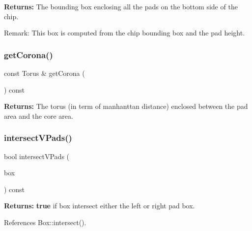 {\bfseries Returns\+:} The bounding box enclosing all the pads on the bottom side of the chip.

\begin{DoxyParagraph}{Remark\+: This box is computed from the chip bounding box and the pad height. }

\end{DoxyParagraph}
\mbox{\label{classKatabatic_1_1ChipTools_a19c65013cccd38e5d4169fc25454b938}} 
\subsubsection{\texorpdfstring{get\+Corona()}{getCorona()}}
{\footnotesize\ttfamily const Torus \& get\+Corona (\begin{DoxyParamCaption}{ }\end{DoxyParamCaption}) const\hspace{0.3cm}{\ttfamily [inline]}}

{\bfseries Returns\+:} The torus (in term of manhanttan distance) enclosed between the pad area and the core area. \mbox{\label{classKatabatic_1_1ChipTools_a708cdae658a916324059d321fafeaa7d}} 
\subsubsection{\texorpdfstring{intersect\+V\+Pads()}{intersectVPads()}}
{\footnotesize\ttfamily bool intersect\+V\+Pads (\begin{DoxyParamCaption}\item[{const \textbf{ Box} \&}]{box }\end{DoxyParamCaption}) const\hspace{0.3cm}{\ttfamily [inline]}}

{\bfseries Returns\+:} {\bfseries true} if {\ttfamily box} intersect either the left or right pad box. 

References Box\+::intersect().

\mbox{\label{classKatabatic_1_1ChipTools_aeead79862ba27f1219a3cbb3ef6999d2}} 
